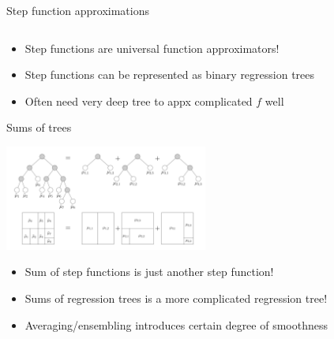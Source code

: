 \documentclass[aspectratio=199]{beamer}
\begin{document}
\begin{frame}{Step function approximations}
\begin{columns}
\end{columns}

\begin{itemize}
\item{Step functions are universal function approximators!}

\item{Step functions can be represented as binary regression trees}


\item[\Walley]{Often need very deep tree to appx complicated $f$ well}

\end{itemize}

\end{frame}

\begin{frame}{Sums of trees}

\begin{center}
\includegraphics[width = 0.5\textwidth]{figures/sum_of_trees}
\end{center}

\begin{itemize}
\item{Sum of step functions is just another step function!}
\item{Sums of regression trees is a more complicated regression tree!}
\item[\Smiley]{Averaging/ensembling introduces certain degree of smoothness}

\end{itemize}

\end{frame}
\end{document}
